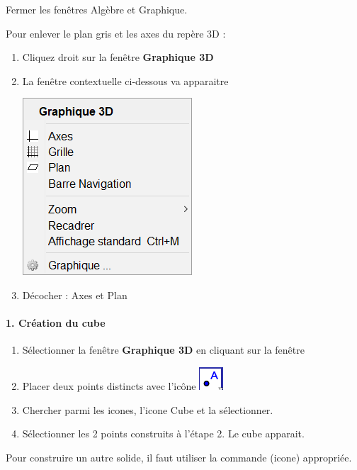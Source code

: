 \documentclass{article}
\begin{document}
\begin{minipage}{0.48\linewidth}
Fermer les fenêtres Algèbre et Graphique.


Pour enlever le plan gris et les axes du repère 3D :

\begin{enumerate}
\item Cliquez droit sur la fenêtre \textbf{Graphique 3D} 
\item La fenêtre contextuelle ci-dessous va apparaitre  

\includegraphics[scale=0.5]{atelier000.png}
\item Décocher : Axes et Plan
\end{enumerate}

\end{minipage}


\paragraph{1. Création du cube}

\begin{minipage}{0.73\linewidth}
\begin{enumerate}
\item Sélectionner la fenêtre \textbf{Graphique 3D} en cliquant sur la fenêtre
\item Placer deux points distincts avec l'icône \includegraphics[scale=0.5]{atelier0.png} 
\item Chercher parmi les icones, l'icone Cube et la sélectionner. 
\item Sélectionner les 2 points construits à l'étape 2. Le cube apparait.
\end{enumerate}
\end{minipage}
\hfill
\begin{minipage}{0.25\linewidth}
\begin{Rq}
Pour construire un autre solide, il faut utiliser la commande (icone) appropriée.
\end{Rq}
 \end{minipage}
 
\end{document}
